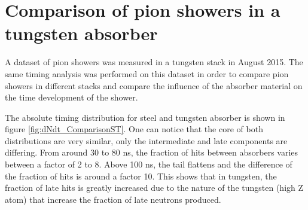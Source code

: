 \section{Comparison of pion showers in a tungsten absorber}

A dataset of pion showers was measured in a tungsten stack in August 2015. The same timing analysis was performed on this dataset \cite{ChristianTungsten} in order to compare pion showers in different stacks and compare the influence of the absorber material on the time development of the shower.

The absolute timing distribution for steel and tungsten absorber is shown in figure \ref{fig:dNdt_ComparisonST}. One can notice that the core of both distributions are very similar, only the intermediate and late components are differing. From around 30 to 80 ns, the fraction of hits between absorbers varies between a factor of 2 to 8. Above 100 ns, the tail flattens and the difference of the fraction of hits is around a factor 10. This shows that in tungsten, the fraction of late hits is greatly increased due to the nature of the tungsten (high Z atom) that increase the fraction of late neutrons produced.

